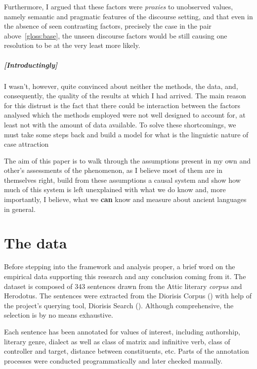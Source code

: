 \documentclass[a4paper, 12pt, article]{memoir}
\begin{document}
Furthermore, I argued that these factors were \emph{proxies} to unobserved
values, namely semantic and pragmatic features of the discourse setting, and
that even in the absence of seen contrasting factors, precisely the case in the
pair above~\ref{gloss:base}, the unseen discourse factors would be still causing
one resolution to be at the very least more likely.

\paragraph{[Introductingly]}
I wasn't, however, quite convinced about neither the methods, the data, and,
consequently, the quality of the results at which I had arrived.
The main reason for this distrust is the fact that there could be interaction
between the factors analysed which the methods employed were not well designed
to account for, at least not with the amount of data available.
To solve these shortcomings, we must take some steps back and build a model for
what is the linguistic nature of case attraction

The aim of this paper is to walk through the assumptions present in my own and
other's assessments of the phenomenon, as I believe most of them are in
themselves right, build from these assumptions a causal system and show how much
of this system is left unexplained with what we do know and, more importantly, I
believe, what we \textbf{can} know and measure about ancient languages in
general.


\chapter{The data}\label{chap:the_data} %

Before stepping into the framework and analysis proper, a brief word on the
empirical data supporting this research and any conclusion coming from it.
The dataset is composed of 343 sentences drawn from the Attic literary
\emph{corpus} and Herodotus.
The sentences were extracted from the Diorisis Corpus
(\cite{TheDiorisisAncientGreekCorpus,diorisis2021}) with help of the project's
querying tool, Diorisis Search (\cite{DiorisisSearch}).
Although comprehensive, the selection is by no means exhaustive.

Each sentence has been annotated for values of interest, including authorship,
literary genre, dialect as well as class of matrix and infinitive verb, class of
controller and target, distance between constituents, etc.
Parts of the annotation processes were conducted programmatically and later
checked manually.
\end{document}
